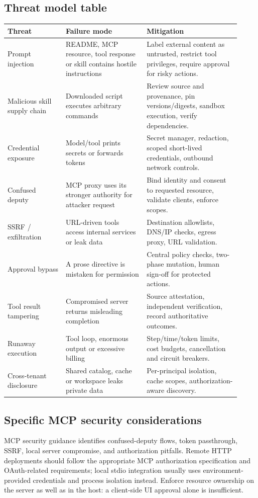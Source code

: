 \documentclass[11pt,letterpaper]{article}
\begin{document}
\subsection{Threat model table}
\begin{longtable}{@{}p{0.23\linewidth}p{0.32\linewidth}p{0.37\linewidth}@{}}
\toprule\textbf{Threat} & \textbf{Failure mode} & \textbf{Mitigation}\\\midrule\endhead
Prompt injection & README, MCP resource, tool response or skill contains hostile instructions & Label external content as untrusted, restrict tool privileges, require approval for risky actions.\\
Malicious skill supply chain & Downloaded script executes arbitrary commands & Review source and provenance, pin versions/digests, sandbox execution, verify dependencies.\\
Credential exposure & Model/tool prints secrets or forwards tokens & Secret manager, redaction, scoped short-lived credentials, outbound network controls.\\
Confused deputy & MCP proxy uses its stronger authority for attacker request & Bind identity and consent to requested resource, validate clients, enforce scopes.\\
SSRF / exfiltration & URL-driven tools access internal services or leak data & Destination allowlists, DNS/IP checks, egress proxy, URL validation.\\
Approval bypass & A prose directive is mistaken for permission & Central policy checks, two-phase mutation, human sign-off for protected actions.\\
Tool result tampering & Compromised server returns misleading completion & Source attestation, independent verification, record authoritative outcomes.\\
Runaway execution & Tool loop, enormous output or excessive billing & Step/time/token limits, cost budgets, cancellation and circuit breakers.\\
Cross-tenant disclosure & Shared catalog, cache or workspace leaks private data & Per-principal isolation, cache scopes, authorization-aware discovery.\\\bottomrule
\end{longtable}

\subsection{Specific MCP security considerations}
MCP security guidance identifies confused-deputy flows, token passthrough, SSRF, local server compromise, and authorization pitfalls. Remote HTTP deployments should follow the appropriate MCP authorization specification and OAuth-related requirements; local stdio integration usually uses environment-provided credentials and process isolation instead. Enforce resource ownership on the server as well as in the host: a client-side UI approval alone is insufficient.\cite{mcpsecurity,mcpauth}
\end{document}
